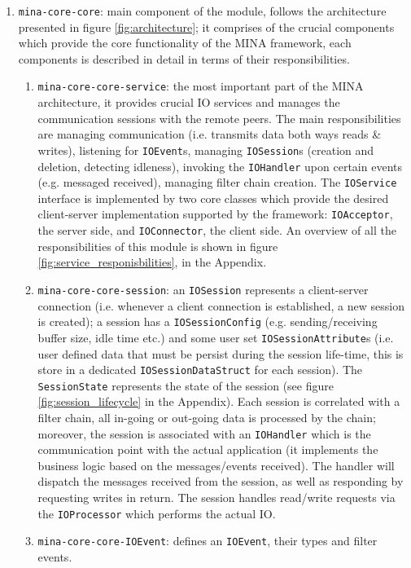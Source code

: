 \begin{enumerate}
    \item \texttt{mina-core-core}: main component of the module, follows the architecture presented in figure \ref{fig:architecture}; it comprises of the crucial components which provide the core functionality of the MINA framework, each components is described in detail in terms of their responsibilities.
        \begin{enumerate}
            \item \texttt{mina-core-core-service}: the most important part of the MINA architecture, it provides crucial IO services and manages the communication sessions with the remote peers. The main responsibilities are managing communication  (i.e. transmits data both ways reads \& writes), listening for \texttt{IOEvent}s, managing \texttt{IOSession}s (creation and deletion, detecting idleness), invoking the \texttt{IOHandler} upon certain events (e.g. messaged received), managing filter chain creation. The \texttt{IOService} interface is implemented by two core classes which provide the desired client-server implementation supported by the framework: \texttt{IOAcceptor}, the server side, and \texttt{IOConnector}, the client side. An overview of all the responsibilities of this module is shown in figure \ref{fig:service_responisbilities}, in the Appendix.
            \item \texttt{mina-core-core-session}: an \texttt{IOSession} represents a client-server connection (i.e. whenever a client connection is established, a new session is created); a session has a \texttt{IOSessionConfig} (e.g. sending/receiving buffer size, idle time etc.) and some user set \texttt{IOSessionAttribute}s (i.e. user defined data that must be persist during the session life-time, this is store in a dedicated \texttt{IOSessionDataStruct} for each session). The \texttt{SessionState} represents the state of the session (see figure \ref{fig:session_lifecycle} in the Appendix). Each session is correlated with a filter chain, all in-going or out-going data is processed  by the chain; moreover, the session is associated with an \texttt{IOHandler} which is the communication point with the actual application (it implements the business logic based on the messages/events received). The handler will dispatch the messages received from the session, as well as responding by requesting writes in return. The session handles read/write requests via the \texttt{IOProcessor} which performs the actual IO.
            \item \texttt{mina-core-core-IOEvent}: defines an \texttt{IOEvent}, their types and filter events.

\end{enumerate}
\end{enumerate}
